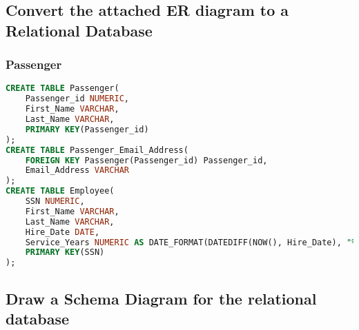 \documentclass{article}
\begin{document}
\subsection{Convert the attached ER diagram to a Relational Database}

\subsubsection{Passenger}
\begin{lstlisting}[language=SQL]
CREATE TABLE Passenger(
	Passenger_id NUMERIC,
	First_Name VARCHAR,
	Last_Name VARCHAR,
	PRIMARY KEY(Passenger_id)
);
CREATE TABLE Passenger_Email_Address(
	FOREIGN KEY Passenger(Passenger_id) Passenger_id,
	Email_Address VARCHAR
);
CREATE TABLE Employee(
	SSN NUMERIC,
	First_Name VARCHAR,
	Last_Name VARCHAR,
	Hire_Date DATE,
	Service_Years NUMERIC AS DATE_FORMAT(DATEDIFF(NOW(), Hire_Date), "%Y")+0,
	PRIMARY KEY(SSN)
);
\end{lstlisting}


\subsection{Draw a Schema Diagram for the relational database}
\end{document}
